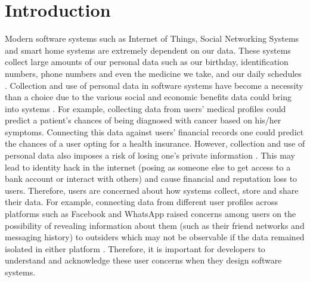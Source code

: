 \documentclass{sigchi}
\begin{document}
\section{Introduction} 

Modern software systems such as Internet of Things, Social Networking Systems and smart home systems are extremely dependent on our data. These systems collect large amounts of our personal data such as our birthday, identification numbers, phone numbers and even the medicine we take, and our daily schedules \cite {new2013google, the2017the}. Collection and use of personal data in software systems have become a necessity than a choice due to the various social and economic benefits data could bring into systems  \cite {marr2015big, tene2012big}. For example, collecting data from users' medical profiles could predict a patient's chances of being diagnosed with cancer based on his/her symptoms. Connecting this data against users' financial records one could predict the chances of a user opting for a health insurance. However, collection and use of personal data also imposes a risk of losing one's private information \cite {european2016data}. This may lead to identity hack in the internet (posing as someone else to get access to a bank account or interact with others) and cause financial and reputation loss to users. Therefore, users are concerned about how systems collect, store and share their data. For example, connecting data from different user profiles across platforms such as Facebook and WhatsApp raised concerns among users on the possibility of revealing information about them (such as their friend networks and messaging history) to outsiders which may not be observable if the data remained isolated in either platform \cite {zingales2017between}. Therefore, it is important for developers to understand and acknowledge these user concerns when they design software systems.
\end{document}
